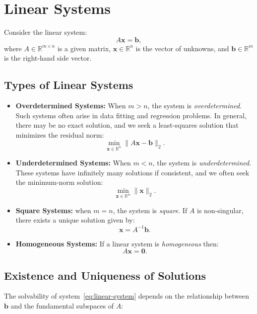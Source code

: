 \documentclass[../../main.tex]{subfiles}
\begin{document}
\chapter{Linear Systems}\label{chap:linear-systems}

Consider the linear system:
\begin{equation}
    A \mathbf{x} = \mathbf{b},
    \label{eq:linear-system}
\end{equation}
where $A \in \mathbb{R}^{m \times n}$ is a given matrix, $\mathbf{x} \in \mathbb{R}^n$ is the vector of unknowns, and $\mathbf{b} \in \mathbb{R}^m$ is the right-hand side vector.

\section{Types of Linear Systems}
\begin{itemize}
    \item \textbf{Overdetermined Systems:} When $m > n$, the system is \emph{overdetermined}. Such systems often arise in data fitting and regression problems. In general, there may be no exact solution, and we seek a least-squares solution that minimizes the residual norm:
          \[
              \min_{\mathbf{x} \in \mathbb{R}^n} \|A\mathbf{x} - \mathbf{b}\|_2.
          \]
    \item \textbf{Underdetermined Systems:} When $m < n$, the system is \emph{underdetermined}. These systems have infinitely many solutions if consistent, and we often seek the minimum-norm solution:
          \[
              \min_{\mathbf{x} \in \mathbb{R}^n} \|\mathbf{x}\|_2.
          \]
    \item \textbf{Square Systems:} when $m = n$, the system is \emph{square}. If $A$ is non-singular, there exists a unique solution given by:
          \[
              \mathbf{x} = A^{-1}\mathbf{b}.
          \]
    \item  \textbf{Homogeneous Systems:} If a linear system is \emph{homogeneous} then:
          \begin{equation}
              A\mathbf{x} = \mathbf{0}.
              \label{eq:homogeneous-system}
          \end{equation}
\end{itemize}

\section{Existence and Uniqueness of Solutions}
The solvability of system~\eqref{eq:linear-system} depends on the relationship between $\mathbf{b}$ and the fundamental subspaces of $A$:
\end{document}
